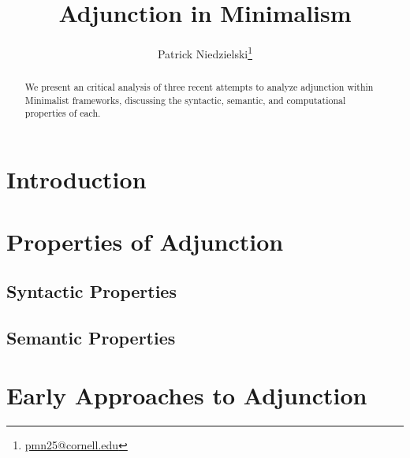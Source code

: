 \documentclass{article}
\begin{document}


\title { Adjunction in Minimalism                                      }
\author{ Patrick Niedzielski\footnote{
           \href{mailto:pmn25@cornell.edu}{pmn25@cornell.edu}
         }                                                             }
\maketitle

\begin{abstract}
  We present an critical analysis of three recent attempts to analyze
  adjunction within Minimalist frameworks, discussing the syntactic,
  semantic, and computational properties of each.

\end{abstract}

\tableofcontents




\section{Introduction}
\label{sec:introduction}

\section{Properties of Adjunction}
\label{sec:adjunction-prop}

\subsection{Syntactic Properties}
\label{sec:syntactic-properties}

\subsection{Semantic Properties}
\label{sec:semantic-properties}

\section{Early Approaches to Adjunction}
\label{sec:early-approaches}
\end{document}
